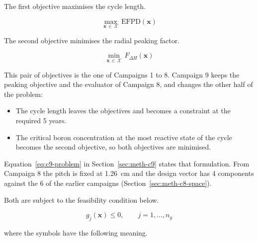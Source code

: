 The first objective maximises the cycle length.

\begin{equation}
\max_{\mathbf{x}\,\in\,\mathcal{X}} \, \mathrm{EFPD}(\mathbf{x})
\label{eq:obj_efpd}
\end{equation}

The second objective minimises the radial peaking factor.

\begin{equation}
\min_{\mathbf{x}\,\in\,\mathcal{X}} \, F_{\Delta H}(\mathbf{x})
\label{eq:obj_fdh}
\end{equation}

This pair of objectives is the one of Campaigns 1 to 8. Campaign 9 keeps
the peaking objective and the evaluator of Campaign 8, and changes the
other half of the problem:

\begin{itemize}
  \item The cycle length leaves the objectives and becomes a constraint
        at the required 5 years.

  \item The critical boron concentration at the most reactive state of
        the cycle becomes the second objective, so both objectives are
        minimised.
\end{itemize}

Equation~\eqref{eq:c9-problem} in Section~\ref{sec:meth-c9} states that
formulation. From Campaign 8 the pitch is fixed at \SI{1.26}{cm} and the
design vector has 4 components against the 6 of the earlier campaigns
(Section~\ref{sec:meth-c8-space}).

Both are subject to the feasibility condition below.

\begin{equation}
g_j(\mathbf{x}) \le 0,
\qquad j = 1,\dots,n_g
\label{eq:constraint_form}
\end{equation}

\noindent where the symbols have the following meaning.

